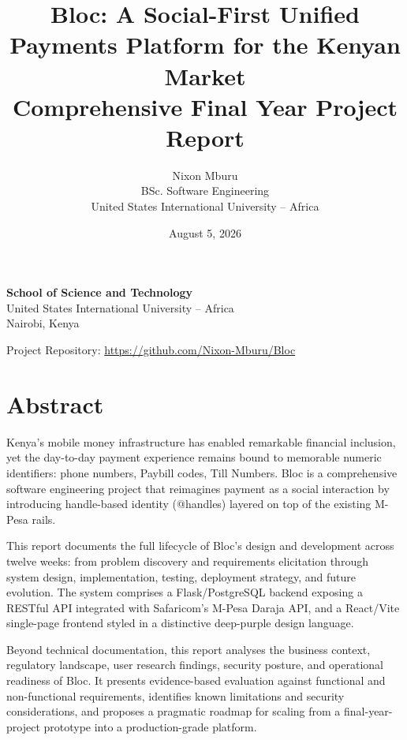 \documentclass[12pt, a4paper, twoside, openright]{report}
\title{Bloc: A Social-First Unified Payments Platform for the Kenyan Market\\[0.5em]
\large Comprehensive Final Year Project Report}
\author{Nixon Mburu \\ \small BSc. Software Engineering \\ \small United States International University -- Africa}
\date{August 5, 2026}
\begin{document}
\maketitle
\thispagestyle{empty}

\vspace{1cm}

\begin{center}
    \textbf{School of Science and Technology} \\
    United States International University -- Africa \\
    Nairobi, Kenya
\end{center}

\vspace{1cm}

\begin{center}
    Project Repository: \url{https://github.com/Nixon-Mburu/Bloc}
\end{center}

\clearpage


\chapter*{Abstract}

Kenya's mobile money infrastructure has enabled remarkable financial inclusion, yet the day-to-day payment experience remains bound to memorable numeric identifiers: phone numbers, Paybill codes, Till Numbers. Bloc is a comprehensive software engineering project that reimagines payment as a social interaction by introducing handle-based identity (@handles) layered on top of the existing M-Pesa rails.

This report documents the full lifecycle of Bloc's design and development across twelve weeks: from problem discovery and requirements elicitation through system design, implementation, testing, deployment strategy, and future evolution. The system comprises a Flask/PostgreSQL backend exposing a RESTful API integrated with Safaricom's M-Pesa Daraja API, and a React/Vite single-page frontend styled in a distinctive deep-purple design language.

Beyond technical documentation, this report analyses the business context, regulatory landscape, user research findings, security posture, and operational readiness of Bloc. It presents evidence-based evaluation against functional and non-functional requirements, identifies known limitations and security considerations, and proposes a pragmatic roadmap for scaling from a final-year-project prototype into a production-grade platform.
\end{document}
